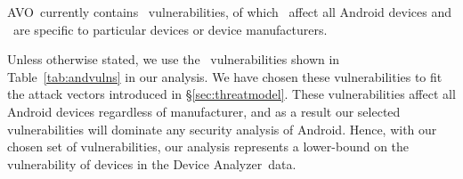 \documentclass{sig-alternate-2013}
\newcommand{\da}{Device Analyzer}
\newcommand{\avo}{AVO}
\begin{document}
\avo\ currently contains \avoNumVulnerabilities\ vulnerabilities, of which \avoNumVulnAllAndroid\ affect all Android devices and \avoNumVulnSpecific\ are specific to particular devices or device manufacturers.

Unless otherwise stated, we use the \daNumVulnsUsed\ vulnerabilities shown in Table~\ref{tab:andvulns} in our analysis.
We have chosen these vulnerabilities to fit the attack vectors introduced in \S\ref{sec:threatmodel}.
These vulnerabilities affect all Android devices regardless of manufacturer, and as a result our selected vulnerabilities will dominate any security analysis of Android.
Hence, with our chosen set of vulnerabilities, our analysis represents a lower-bound on the vulnerability of devices in the \da\ data.


\end{document}
